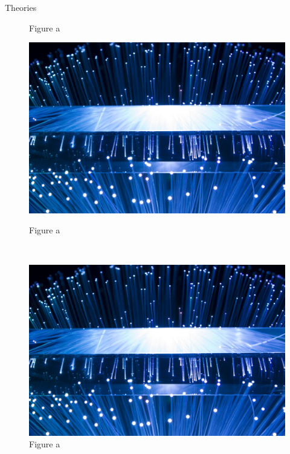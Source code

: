 \documentclass[t]{beamer}
\begin{document}
\begin{frame}{Theories}
\begin{center}
\begin{figure}[htbp]
\begin{minipage}[t]{0.3\textwidth}
                    \caption*{Figure a}
        \end{minipage}
    \hfill
        \begin{minipage}[t]{0.3\textwidth}
            \centering
            \includegraphics[width=\textwidth]{image/a}
                    \caption*{Figure a}
        \end{minipage}  
    \\
        \begin{minipage}[t]{0.3\textwidth}
            \centering
            \includegraphics[width=\textwidth]{image/a}
            \caption*{Figure a}
        \end{minipage}
    \hfill
        \begin{minipage}[t]{0.3\textwidth}
            \centering

\end{minipage}
\end{figure}
\end{center}
\end{frame}
\end{document}
